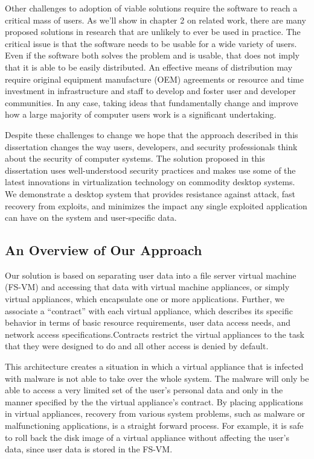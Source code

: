 Other challenges to adoption of viable solutions require the software to reach a critical mass of users.  As we'll show in chapter 2 on related work, there are many proposed solutions in research that are unlikely to ever be used in practice. The critical issue is that the software needs to be usable for a wide variety of users. Even if the software both solves the problem and is usable, that does not imply that it is able to be easily distributed. An effective means of distribution may require original equipment manufacture (OEM) agreements or resource and time investment in infrastructure and staff to develop and foster user and developer communities. In any case, taking ideas that fundamentally change and improve how a large majority of computer users work is a significant undertaking.

Despite these challenges to change we hope that the approach described in this dissertation changes the way users, developers, and security professionals think about the security of computer systems. The solution proposed in this dissertation uses well-understood security practices and makes use some of the latest innovations in virtualization technology on commodity desktop systems. We demonstrate a desktop system that provides resistance against attack, fast recovery from exploits, and minimizes the impact any single exploited application can have on the system and user-specific data.

\subsection{An Overview of Our Approach}

Our solution is based on separating user data into a file server virtual machine (FS-VM) and accessing that data with virtual machine appliances, or simply virtual appliances, which encapsulate one or more applications. Further, we associate a ``contract'' with each virtual appliance, which describes its specific behavior in terms of basic resource requirements, user data access needs, and network access specifications.Contracts restrict the virtual appliances to the task that they were designed to do and all other access is denied by default.

This architecture creates a situation in which a virtual appliance that is infected with malware is not able to take over the whole system. The malware will only be able to access a very limited set of the user's personal data and only in the manner specified by the the virtual appliance's contract. By placing applications in virtual appliances, recovery from various system problems, such as malware or malfunctioning applications, is a straight forward process. For example, it is safe to roll back the disk image of a virtual appliance without affecting the user's data, since user data is stored in the FS-VM. 

